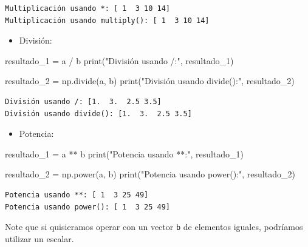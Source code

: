 \documentclass[
  letterpaper,
  DIV=11,
  numbers=noendperiod]{scrreprt}
\newenvironment{Shaded}{\begin{snugshade}}{\end{snugshade}}
\newcommand{\BuiltInTok}[1]{\textcolor[rgb]{0.00,0.23,0.31}{#1}}
\newcommand{\NormalTok}[1]{\textcolor[rgb]{0.00,0.23,0.31}{#1}}
\newcommand{\OperatorTok}[1]{\textcolor[rgb]{0.37,0.37,0.37}{#1}}
\newcommand{\StringTok}[1]{\textcolor[rgb]{0.13,0.47,0.30}{#1}}
\providecommand{\tightlist}{%
  \setlength{\itemsep}{0pt}\setlength{\parskip}{0pt}}\usepackage{longtable,booktabs,array}
\begin{document}
\begin{verbatim}
Multiplicación usando *: [ 1  3 10 14]
Multiplicación usando multiply(): [ 1  3 10 14]
\end{verbatim}

\begin{itemize}
\tightlist
\item
  División:
\end{itemize}

\begin{Shaded}
\begin{Highlighting}[]
\NormalTok{resultado\_1 }\OperatorTok{=}\NormalTok{ a }\OperatorTok{/}\NormalTok{ b}
\BuiltInTok{print}\NormalTok{(}\StringTok{"División usando /:"}\NormalTok{, resultado\_1) }

\NormalTok{resultado\_2 }\OperatorTok{=}\NormalTok{ np.divide(a, b)}
\BuiltInTok{print}\NormalTok{(}\StringTok{"División usando divide():"}\NormalTok{, resultado\_2) }
\end{Highlighting}
\end{Shaded}

\begin{verbatim}
División usando /: [1.  3.  2.5 3.5]
División usando divide(): [1.  3.  2.5 3.5]
\end{verbatim}

\begin{itemize}
\tightlist
\item
  Potencia:
\end{itemize}

\begin{Shaded}
\begin{Highlighting}[]
\NormalTok{resultado\_1 }\OperatorTok{=}\NormalTok{ a }\OperatorTok{**}\NormalTok{ b}
\BuiltInTok{print}\NormalTok{(}\StringTok{"Potencia usando **:"}\NormalTok{, resultado\_1) }

\NormalTok{resultado\_2 }\OperatorTok{=}\NormalTok{ np.power(a, b)}
\BuiltInTok{print}\NormalTok{(}\StringTok{"Potencia usando power():"}\NormalTok{, resultado\_2) }
\end{Highlighting}
\end{Shaded}

\begin{verbatim}
Potencia usando **: [ 1  3 25 49]
Potencia usando power(): [ 1  3 25 49]
\end{verbatim}

\begin{tcolorbox}[enhanced jigsaw, bottomrule=.15mm, leftrule=.75mm, opacityback=0, colback=white, toprule=.15mm, bottomtitle=1mm, opacitybacktitle=0.6, rightrule=.15mm, left=2mm, arc=.35mm, coltitle=black, title=\textcolor{quarto-callout-note-color}{\faInfo}\hspace{0.5em}{Note}, breakable, toptitle=1mm, colframe=quarto-callout-note-color-frame, titlerule=0mm, colbacktitle=quarto-callout-note-color!10!white]

Note que si quisieramos operar con un vector \texttt{b} de elementos
iguales, podríamos utilizar un escalar.

\end{tcolorbox}
\end{document}
